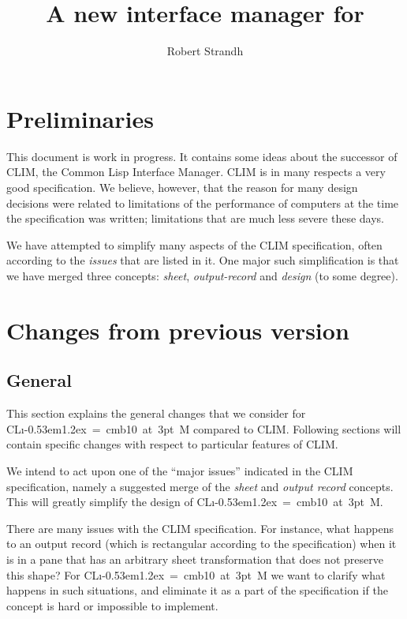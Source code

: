 \documentclass{report}
\title{\clim{}\\ A new interface manager for\\ \cl{}}
\author{Robert Strandh}
\def\Tiny{ \font\Tinyfont = cmb10 at 3pt \relax  \Tinyfont}
\def\clim{\textsf{CL{\i}\kern-0.53em\raise1.2ex\hbox{\Tiny 3}M}}
\def\climtwo{CLIM\thinspace{\small II}}
\begin{document}
\maketitle

\chapter{Preliminaries}

This document is work in progress.  It contains some ideas about the
successor of \climtwo{}, the Common Lisp Interface Manager.  \climtwo{} is in
many respects a very good specification.  We believe, however, that
the reason for many design decisions were related to limitations of
the performance of computers at the time the specification was
written; limitations that are much less severe these days.  

We have attempted to simplify many aspects of the \climtwo{}
specification, often according to the \emph{issues} that are listed in
it.  One major such simplification is that we have merged three
concepts: \emph{sheet}, \emph{output-record} and \emph{design} (to
some degree). 

\chapter{Changes from previous version}

\section{General}

This section explains the general changes that we consider for \clim{}
compared to \climtwo{}.  Following sections will contain specific changes
with respect to particular features of \climtwo{}.

We intend to act upon one of the ``major issues'' indicated in the
\climtwo{} specification, namely a suggested merge of the \emph{sheet} and
\emph{output record} concepts.  This will greatly simplify the design
of \clim{}.

There are many issues with the \climtwo{} specification.  For
instance, what happens to an output record (which is rectangular
according to the specification) when it is in a pane that has an
arbitrary sheet transformation that does not preserve this shape?  For
\clim{} we want to clarify what happens in such situations, and
eliminate it as a part of the specification if the concept is hard or
impossible to implement. 
\end{document}

